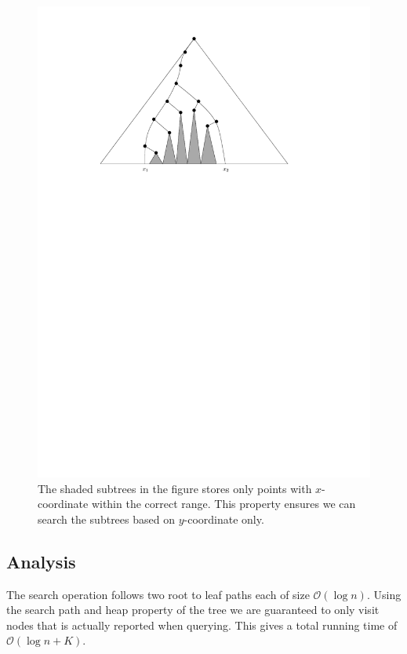 \documentclass[twoside,11pt,openright]{report}
\begin{document}
\begin{figure}[h]
	\centering
	\includegraphics[scale=0.7]{../figures/internal_pst_query}
	\caption{The shaded subtrees in the figure stores only points with $x$-coordinate within the correct range. This property ensures we can search the subtrees based on $y$-coordinate only.}
	\label{fig:static_pst_query}
\end{figure}

\subsection{Analysis}
The search operation follows two root to leaf paths each of size $\mathcal{O}(\log n)$. Using the search path and heap property of the tree we are guaranteed to only visit nodes that is actually reported when querying. This gives a total running time of $\mathcal{O}(\log n + K)$.
\end{document}
